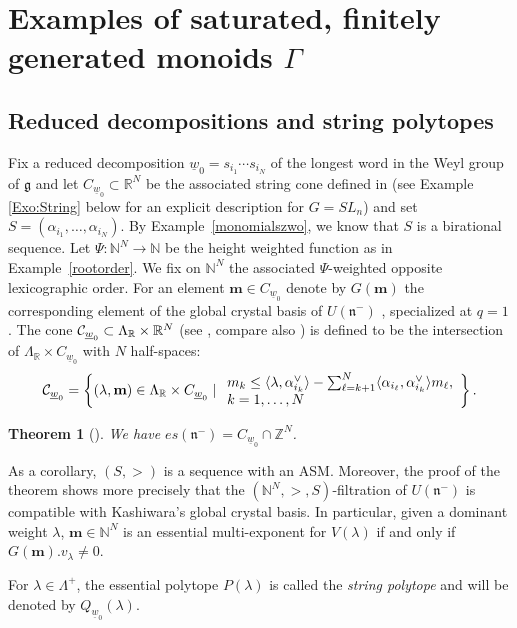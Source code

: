 \documentclass{emsprocart}
\newtheorem{theorem}{Theorem}[section]
\theoremstyle{definition}
\begin{document}
\section{Examples of saturated, finitely generated monoids $\Gamma$}\label{examplesectionASM}
\subsection{Reduced decompositions and string polytopes}\label{Sec:String}
Fix a reduced decomposition $\underline{w}_0=s_{i_1}\cdots s_{i_N}$ of the longest word in the Weyl group of $\mathfrak g$
and let ${C}_{\underline{w}_0}\subset \mathbb R^N$ be the associated string cone defined in \cite{BZ,L3} (see Example \ref{Exo:String} below for an explicit description for $G=SL_n$)
and set $S=({\alpha_{i_1}},\ldots, {\alpha_{i_N}})$. By Example~\ref{monomialszwo}, we know that
$S$ is a birational sequence. Let $\Psi:\mathbb N^N\rightarrow \mathbb N$ be the height weighted function
as in Example~\ref{rootorder}. We fix on $\mathbb N^N$ the associated $\Psi$-weighted opposite lexicographic order.
For an element $\mathbf m\in {C}_{\underline{w}_0}$ denote by $G(\mathbf m)$ the corresponding element
of the global crystal basis of $U(\mathfrak n^-)$ \cite{Ka}, specialized at $q=1$.
The cone ${\cal C}_{\underline{w}_0}\subset\Lambda_{\mathbb R}\times\mathbb R^N$ (see \cite{BZ,L3}, compare also \cite{AB})
is defined to be the intersection of $\Lambda_{\mathbb R}\times {C}_{\underline{w}_0}$ with $N$ half-spaces:
\begin{equation}\label{weightequation}
{\cal C}_{\underline{w}_0}=\left\{(\lambda,\mathbf m)\in \Lambda_{\mathbb R}\times {C}_{\underline{w}_0}\mid
\begin{array}{l}
m_k \le \langle\lambda,\alpha_{i_k}^\vee\rangle -\sum_{\ell=k+1}^N\langle \alpha_{i_\ell},\alpha_{i_k}^\vee \rangle m_\ell,\\ 
k=1,\ldots,N
\end{array}\right\}.
\end{equation}
\begin{theorem}[\cite{FaFL}]\label{stringCone}
We have $es(\mathfrak n^-)={C}_{\underline{w}_0}\cap \mathbb Z^N$.
\end{theorem}
As a corollary, $(S,>)$ is a sequence with an ASM. Moreover, the proof of the theorem shows more precisely that the $(\mathbb N^N,>,S)$-filtration of $U(\mathfrak n^-)$ is compatible with Kashiwara's global crystal basis. In particular, given a dominant weight $\lambda$, $\mathbf m\in   \mathbb N^N$ is an essential multi-exponent for $V(\lambda)$ if and only if $G(\mathbf m).v_\lambda\not=0$.
\par
For $\lambda\in\Lambda^+$, the essential polytope $P(\lambda)$ is called the \emph{string polytope} and will be denoted by $Q_{\underline{w}_0}(\lambda)$.
\end{document}
